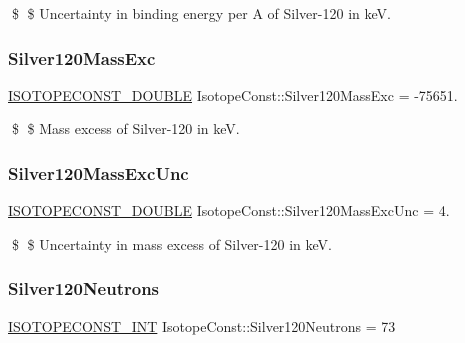 \$ \$ Uncertainty in binding energy per A of Silver-\/120 in keV. \mbox{\label{group___isotope_const-_silver-_ag120_ga1ad14567f4ea36732f45583ad9b15824}} 
\subsubsection{\texorpdfstring{Silver120\+Mass\+Exc}{Silver120MassExc}}
{\footnotesize\ttfamily \mbox{\hyperlink{group___isotope_const-_macros_ga8f45a7272ce02c0b4c65c44636ed719a}{I\+S\+O\+T\+O\+P\+E\+C\+O\+N\+S\+T\+\_\+\+D\+O\+U\+B\+LE}} Isotope\+Const\+::\+Silver120\+Mass\+Exc = -\/75651.}

\$ \$ Mass excess of Silver-\/120 in keV. \mbox{\label{group___isotope_const-_silver-_ag120_ga0403d73e029e5c6c71916e5838277011}} 
\subsubsection{\texorpdfstring{Silver120\+Mass\+Exc\+Unc}{Silver120MassExcUnc}}
{\footnotesize\ttfamily \mbox{\hyperlink{group___isotope_const-_macros_ga8f45a7272ce02c0b4c65c44636ed719a}{I\+S\+O\+T\+O\+P\+E\+C\+O\+N\+S\+T\+\_\+\+D\+O\+U\+B\+LE}} Isotope\+Const\+::\+Silver120\+Mass\+Exc\+Unc = 4.}

\$ \$ Uncertainty in mass excess of Silver-\/120 in keV. \mbox{\label{group___isotope_const-_silver-_ag120_ga2030189cc6272a1954b48fc38c5cc3f9}} 
\subsubsection{\texorpdfstring{Silver120\+Neutrons}{Silver120Neutrons}}
{\footnotesize\ttfamily \mbox{\hyperlink{group___isotope_const-_macros_ga5f18360b3e99483a35c32d789e62621c}{I\+S\+O\+T\+O\+P\+E\+C\+O\+N\+S\+T\+\_\+\+I\+NT}} Isotope\+Const\+::\+Silver120\+Neutrons = 73}

